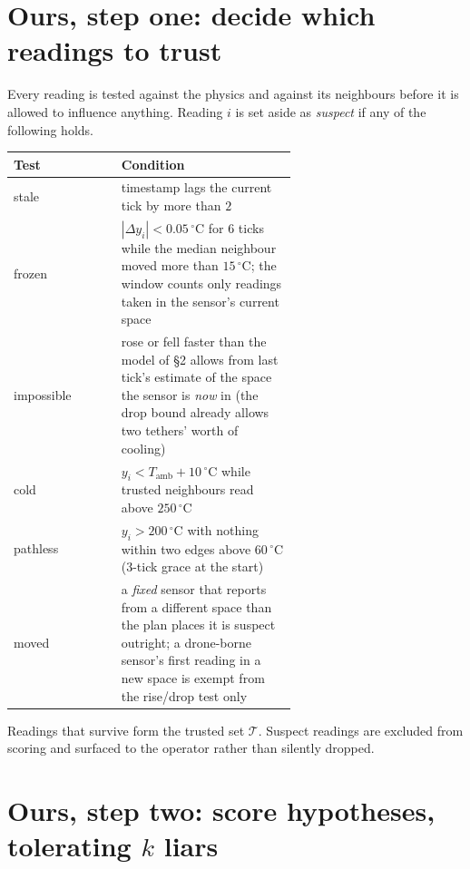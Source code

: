 \documentclass[11pt]{article}
\newcommand{\Tamb}{T_{\mathrm{amb}}}
\newcommand{\Tset}{\mathcal{T}}
\newcommand{\degC}{^\circ\mathrm{C}}
\begin{document}
\section{Ours, step one: decide which readings to trust}

Every reading is tested against the physics and against its neighbours before it is allowed to influence anything. Reading $i$ is set aside as \emph{suspect} if any of the following holds.

\begin{center}
\renewcommand{\arraystretch}{1.35}
\begin{tabular}{@{}l>{\raggedright\arraybackslash}p{0.62\linewidth}@{}}
\toprule
\textbf{Test} & \textbf{Condition} \\
\midrule
stale      & timestamp lags the current tick by more than $2$ \\
frozen     & $|\Delta y_i| < 0.05\,\degC$ for $6$ ticks while the median neighbour moved more than $15\,\degC$; the window counts only readings taken in the sensor's current space \\
impossible & rose or fell faster than the model of \S2 allows from last tick's estimate of the space the sensor is \emph{now} in (the drop bound already allows two tethers' worth of cooling) \\
cold       & $y_i < \Tamb + 10\,\degC$ while trusted neighbours read above $250\,\degC$ \\
pathless   & $y_i > 200\,\degC$ with nothing within two edges above $60\,\degC$ (3-tick grace at the start) \\
moved      & a \emph{fixed} sensor that reports from a different space than the plan places it is suspect outright; a drone-borne sensor's first reading in a new space is exempt from the rise/drop test only \\
\bottomrule
\end{tabular}
\end{center}

Readings that survive form the trusted set $\Tset$. Suspect readings are excluded from scoring and surfaced to the operator rather than silently dropped.

\section{Ours, step two: score hypotheses, tolerating $k$ liars}
\end{document}
